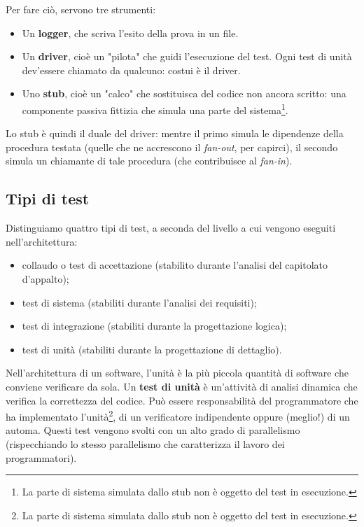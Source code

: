 \documentclass[a4paper]{article}
\begin{document}
		
Per fare ciò, servono tre strumenti:
		
	\begin{itemize}
		
			
	\item Un \textbf{logger}, che scriva l'esito della prova in un file.
			
	\item Un \textbf{driver}, cioè un "pilota" che guidi l'esecuzione del test. Ogni test di unità dev'essere chiamato da qualcuno: costui è il driver.
			
	\item Uno \textbf{stub}, cioè un "calco" che sostituisca del codice non ancora scritto: una componente passiva fittizia che simula una parte del sistema\footnote{La parte di sistema simulata dallo stub non è oggetto del test in esecuzione.}.
		
	\end{itemize}

		
Lo stub è quindi il duale del driver: mentre il primo simula le dipendenze della procedura testata (quelle che ne accrescono il \emph{fan-out}, per capirci), il secondo simula un chiamante di tale procedura (che contribuisce al \emph{fan-in}).

		
	\subsection{Tipi di test}

		
Distinguiamo quattro tipi di test, a seconda del livello a cui vengono eseguiti nell'architettura:
		
	\begin{itemize}
		
			
	\item collaudo o test di accettazione (stabilito durante l'analisi del capitolato d'appalto);
			
	\item test di sistema (stabiliti durante l'analisi dei requisiti);
			
	\item test di integrazione (stabiliti durante la progettazione logica);
			
	\item test di unità (stabiliti durante la progettazione di dettaglio).
		
	\end{itemize}

		
Nell'architettura di un software, l'unità è la più piccola quantità di software che conviene verificare da sola. Un \textbf{test di unità} è un'attività di analisi dinamica che verifica la correttezza del codice. Può essere responsabilità del programmatore che ha implementato l'unità\footnote{La parte di sistema simulata dallo stub non è oggetto del test in esecuzione.}, di un verificatore indipendente oppure (meglio!) di un automa. Questi test vengono svolti con un alto grado di parallelismo (rispecchiando lo stesso parallelismo che caratterizza il lavoro dei programmatori).
		
\end{document}
